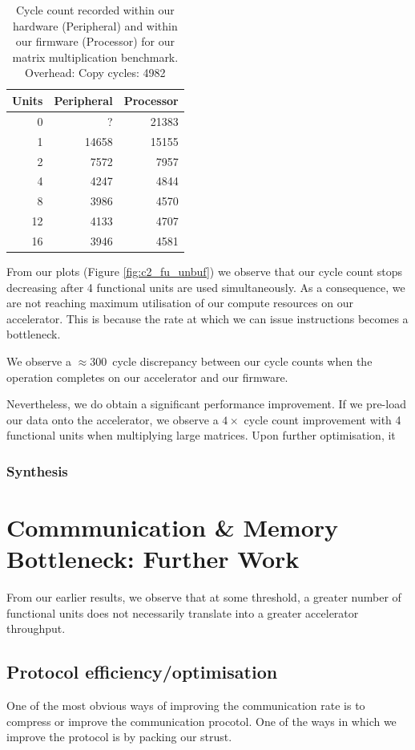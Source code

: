 \documentclass[a4paper,8pt]{report}
\begin{document}
\begin{table}[h]
  \centering
  \begin{tabular}{r|rr}
    \toprule
    Units & Peripheral & Processor \\
    \midrule
    0&?&21383\\
    1&14658&15155\\
    2&7572& 7957\\
    4&4247& 4844\\
    8&3986& 4570\\
    12&4133& 4707\\
    16&3946& 4581\\
    \bottomrule
  \end{tabular}
  \caption{Cycle count recorded within our hardware (Peripheral) and within our
    firmware (Processor) for our matrix multiplication benchmark. Overhead: Copy cycles: 4982}
  \label{table:c2_fu_unbuf}
\end{table}



From our plots (Figure \ref{fig:c2_fu_unbuf}) we observe that our cycle count
stops decreasing after 4 functional units are used simultaneously. As a
consequence, we are not reaching maximum utilisation of our compute resources on
our accelerator. This is because the rate at which we can issue instructions
becomes a bottleneck.

We observe a $\approx 300$~cycle discrepancy between our cycle counts when the
operation completes on our accelerator and our firmware. 

Nevertheless, we do obtain a significant performance improvement. If we pre-load
our data onto the accelerator, we observe a $4\times$ cycle count improvement
with 4 functional units when multiplying large matrices. Upon further
optimisation, it 


\subsection{Synthesis}

\chapter{Commmunication \& Memory Bottleneck: Further Work}
From our earlier results, we observe that at some threshold, a greater number of
functional units does not necessarily translate into a greater accelerator
throughput. 

\section{Protocol efficiency/optimisation}
One of the most obvious ways of improving the communication rate is to compress
or improve the communication procotol. One of the ways in which we improve the
protocol is by packing our strust.
\end{document}
